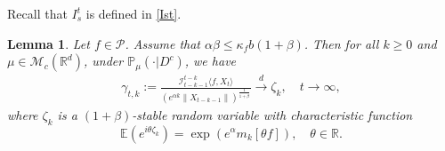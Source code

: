 \documentclass[12pt,a4paper]{amsart}
\theoremstyle{plain}
\newtheorem{lem}[thm]{Lemma}
\theoremstyle{definition}
\numberwithin{equation}{section}
\begin{document}
    Recall that $I_s^t$ is defined in \eqref{Ist}.
\begin{lem}\label{lem: mainlemma}
    Let $f\in \mathcal{P}$. 
    Assume that $\alpha\beta\leq \kappa_fb(1+\beta)$.
    Then for all $k\geq 0$ and $\mu \in \mathcal M_c(\mathbb R^d)$, under $\mathbb{P}_{\mu}(\cdot | D ^c)$, we have
\begin{equation}\begin{split}
    \gamma_{t,k}
    :=\frac{\mathcal I_{t-k-1}^{t-k}\langle f ,X_t\rangle}{(e^{\alpha k}\|X_{t-k-1}\|)^{\frac{1}{1+\beta}}}\xrightarrow{d}\zeta_k, \quad t\rightarrow \infty, \label{limitdistribution1}
\end{split}\end{equation}
    where $\zeta_k$ is a $(1+\beta)$-stable random variable with characteristic function
\[
    \mathbb{E}(e^{i\theta\zeta_k})
    =\exp(e^{\alpha}m_k[\theta f]),\quad \theta \in \mathbb R.
\]
\end{lem}
\end{document}
